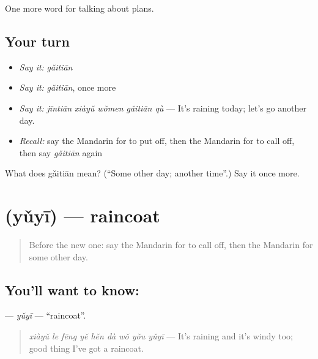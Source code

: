 \begin{grammarlens}[title={What you've built}]
One more word for talking about plans.
\end{grammarlens}

\subsection*{Your turn}
\begin{itemize}
\raggedright
  \item \emph{Say it:} \emph{gǎitiān}
  \item \emph{Say it:} \emph{gǎitiān}, once more
  \item \emph{Say it:} \emph{jīntiān xiàyǔ wǒmen gǎitiān qù} — It's raining today; let's go another day.
  \item \emph{Recall:} say the Mandarin for to put off, then the Mandarin for to call off, then say \emph{gǎitiān} again
\end{itemize}

\begin{tcolorbox}[breakable,colback=teal!4,colframe=teal!35!black,title={Before you move on}]
What does gǎitiān mean? (\textquotedblleft{}Some other day; another time\textquotedblright{}.) Say it once more.
\end{tcolorbox}
\section[\texorpdfstring{\zh{雨衣} (yǔyī)}{雨衣 (yǔyī)}]{ (yǔyī) — raincoat}

\label{lesson:ZH-C234-yuyi}



\begin{quote}
Before the new one: say the Mandarin for to call off, then the Mandarin for some other day.
\end{quote}

\subsection*{You'll want to know: }
\textbf{} — \emph{yǔyī} — \textquotedblleft{}raincoat\textquotedblright{}.

\begin{quote}
\textbf{} \emph{xiàyǔ le fēng yě hěn dà wǒ yǒu yǔyī} — It's raining and it's windy too; good thing I've got a raincoat.
\end{quote}

